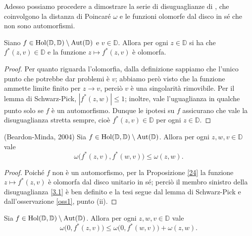 Adesso possiamo procedere a dimostrare la serie di disuguaglianze di \cite{BM}, che coinvolgono la distanza di Poincaré $\omega$ e le funzioni olomorfe dal disco in sé che non sono automorfismi.

\begin{prop} \label{24}
  Siano $f \in \text{\normalfont{Hol}}(\mathbb{D},\mathbb{D})\setminus\text{\normalfont{Aut}}(\mathbb{D})$ e $v \in \mathbb{D}$. Allora per ogni $z \in \mathbb{D}$ si ha che $f^*(z,v) \in \mathbb{D}$ e la funzione $z \longmapsto f^*(z,v)$ è olomorfa.
\end{prop}

\begin{proof}
  Per quanto riguarda l'olomorfia, dalla definizione sappiamo che l'unico punto che potrebbe dar problemi è $v$; abbiamo però visto che la funzione ammette limite finito per $z \longrightarrow v$, perciò $v$ è una singolarità rimovibile. Per il lemma di Schwarz-Pick, $|f^*(z,w)| \le 1$; inoltre, vale l'uguaglianza in qualche punto solo se $f$ è un automorfismo. Dunque le ipotesi su $f$ assicurano che vale la disuguaglianza stretta sempre, cioè $f^*(z,v) \in \mathbb{D}$ per ogni $z \in \mathbb{D}$.
\end{proof}

\begin{thm} \label{31}
  (Beardon-Minda, 2004) Sia $f \in \text{\normalfont{Hol}}(\mathbb{D},\mathbb{D})\setminus\text{\normalfont{Aut}}(\mathbb{D})$. Allora per ogni $z, w, v \in \mathbb{D}$ vale
  \begin{equation} \label{3.1}
    \omega\bigl(f^*(z,v),f^*(w,v)\bigr) \le \omega(z,w).
  \end{equation}
\end{thm}

\begin{proof}
  Poiché $f$ non è un automorfismo, per la Proposizione \ref{24} la funzione $z \longmapsto f^*(z,v)$ è olomorfa dal disco unitario in sé; perciò il membro sinistro della disuguaglianza \eqref{3.1} è ben definito e la tesi segue dal lemma di Schwarz-Pick e dall'osservazione \ref{oss1}, punto (ii).
\end{proof}

\begin{cor} \label{32}
  Sia $f \in \text{\normalfont{Hol}}(\mathbb{D},\mathbb{D})\setminus\text{\normalfont{Aut}}(\mathbb{D})$. Allora per ogni $z, w, v \in \mathbb{D}$ vale
  \begin{equation}
    \omega\bigl(0, f^*(z,v)\bigr) \le \omega\bigl(0,f^*(w,v)\bigr)+\omega(z,w).
  \end{equation}
\end{cor}

